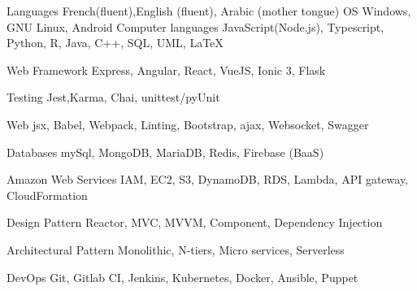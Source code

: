

\begin{cvskills}
  \cvskill
    {Languages } %
    {French(fluent),English (fluent), Arabic (mother tongue)} %
  \cvskill
    {OS} %
    {Windows, GNU Linux, Android} %
  \cvskill
    {Computer languages} %
    {JavaScript(Node.js), Typescript, Python, R, Java, C++, SQL, UML, LaTeX} %

  \cvskill
    {Web Framework} %
    {Express, Angular, React, VueJS, Ionic 3, Flask} %
    
  \cvskill
    {Testing} %
    {Jest,Karma, Chai, unittest/pyUnit  } %
    

  \cvskill
    {Web} %
    {jsx, Babel, Webpack, Linting, Bootstrap, ajax, Websocket, Swagger} %

  \cvskill
    {Databases} %
    {mySql, MongoDB, MariaDB, Redis, Firebase (BaaS) } %

\cvskill
    {Amazon Web Services} %
    {IAM, EC2, S3, DynamoDB, RDS, Lambda, API gateway, CloudFormation } %

  \cvskill
    {Design Pattern} %
    { Reactor, MVC, MVVM, Component, Dependency Injection  } %
    
  \cvskill
    {Architectural Pattern} %
    {Monolithic, N-tiers, Micro services, Serverless } %

  \cvskill
    {DevOps} %
    {Git, Gitlab CI, Jenkins, Kubernetes, Docker, Ansible, Puppet } %


\end{cvskills}

